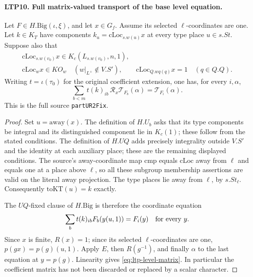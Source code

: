 \documentclass[11pt,a4paper]{article}
\numberwithin{equation}{section}
\theoremstyle{remark}\newtheorem{remark}[theorem]{Remark}
\begin{document}
\paragraph{LTP10. Full matrix-valued transport of the base level equation.}
\label{claim:LTP10}
Let \(F\in H.\mathrm{Big}(\iota,\xi)\), and let \(x\in G_f\).
Assume its selected \(\ell\)-coordinates are one.  Let \(k\in K_T\)
have components \(k_u=\mathrm{cLoc}_{s.w(u)}x\) at every type
place \(u\in s.St\).  Suppose also that
\[
\begin{gathered}
 \mathrm{cLoc}_{s.w(v_0)}x\in K_c(L_{s.w(v_0)},n,1),\\
 \mathrm{cLoc}_{w}x\in KO_w
                  \quad(w|_{L^+}\notin V.S'),\qquad
 \mathrm{cLoc}_{Q.wq(q)}x=1\quad(q\in Q.Q).
\end{gathered}
\]
Writing \(t=\iota(\tau_0)\) for the original coefficient extension,
one has, for every \(i,\alpha\),
\begin{equation}\label{eq:ltp-level-matrix}
       \sum_{b<m} t(k)_{ib}\,
            \mathscr R_x\mathcal T_{F_b}(\alpha)
                      =\mathcal T_{F_i}(\alpha).
\end{equation}
This is the full source \texttt{part\allowbreak UR2Fix}.
\begin{proof}
Set \(u=\mathrm{away}(x)\).  The definition of \(H.U_b\) asks that
its type components be integral and its distinguished component
lie in \(K_c(1)\); these follow from the stated conditions.
The definition of \(H.UQ\) adds precisely integrality outside
\(V.S'\) and the identity at each auxiliary place; these are the
remaining displayed conditions.  The source's away-coordinate
map \(\mathrm{cmp}\) equals \(\mathrm{cLoc}\) away from \(\ell\)
and equals one at a place above \(\ell\), so all these subgroup
membership assertions are valid on the literal away projection.
The type places lie away from \(\ell\), by \(s.St_\ell\).
Consequently \(\mathrm{toKT}(u)=k\) exactly.

The \(UQ\)-fixed clause of \(H.\mathrm{Big}\) is therefore the
coordinate equation
\[
       \sum_b t(k)_{ib}F_b(y(u,1))=F_i(y)
                     \quad\hbox{for every }y.
\]
Since \(x\) is finite, \(R(x)=1\); since its selected
\(\ell\)-coordinates are one, \(p(gx)=p(g)(u,1)\).
Apply \(E\), then \(R(g^{-1})\), and finally \(\alpha\) to the
last equation at \(y=p(g)\).  Linearity gives
\eqref{eq:ltp-level-matrix}.  In particular the coefficient
matrix has not been discarded or replaced by a scalar character.
\end{proof}
\end{document}
